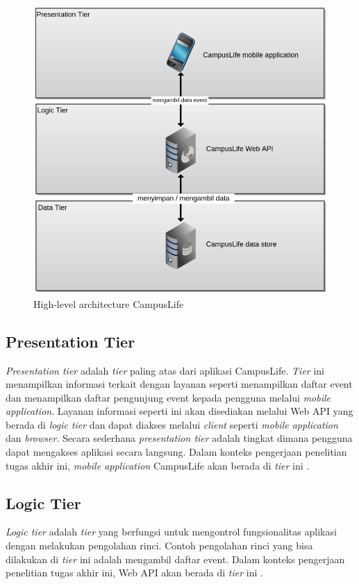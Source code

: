 \documentclass[a4paper, 12pt, oneside]{report}
\begin{document}
\begin{figure}[htp]
\centering
\includegraphics[scale=0.40]{images/test.png}
\caption{High-level architecture CampusLife}
\label{high-level-architecture-cl}
\end{figure}

\subsection{Presentation Tier}
\onehalfspacing \textit{Presentation tier} adalah \textit{tier} paling atas dari aplikasi CampusLife. \textit{Tier} ini menampilkan informasi terkait dengan layanan seperti menampilkan daftar event dan menampilkan daftar pengunjung event kepada pengguna melalui \textit{mobile application}. Layanan informasi seperti ini akan disediakan melalui Web API yang berada di \textit{logic tier} dan dapat diakses melalui \textit{client} seperti \textit{mobile application} dan \textit{browser}. Secara sederhana \textit{presentation tier} adalah tingkat dimana pengguna dapat mengakses aplikasi secara langsung. Dalam konteks pengerjaan penelitian tugas akhir ini, \textit{mobile application} CampusLife akan berada di \textit{tier} ini \cite{multitier-architecture-wikipedia}.

\subsection{Logic Tier}
\onehalfspacing \textit{Logic tier} adalah \textit{tier} yang berfungsi untuk mengontrol fungsionalitas aplikasi dengan melakukan pengolahan rinci. Contoh pengolahan rinci yang bisa dilakukan di \textit{tier} ini adalah mengambil daftar event. Dalam konteks pengerjaan penelitian tugas akhir ini, Web API akan berada di \textit{tier} ini \cite{multitier-architecture-wikipedia}.
\end{document}
